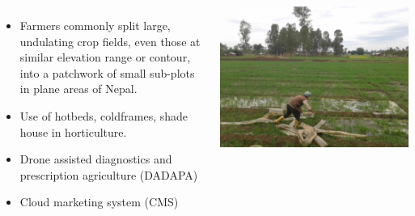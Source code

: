 \documentclass[11pt,dvipsnames,ignorenonframetext,aspectratio=169]{beamer}
\begin{document}
\begin{frame}{}
\protect\hypertarget{section-10}{}
\begin{columns}[T, onlytextwidth]

\begin{itemize}
\item Farmers commonly split large, undulating crop fields, even those at similar elevation range or contour, into a
patchwork of small sub-plots in plane areas of Nepal.
\item Use of hotbeds, coldframes, shade house in horticulture.
\item Drone assisted diagnostics and prescription agriculture (DADAPA)
\item Cloud marketing system (CMS)
\end{itemize}



\includegraphics[width=0.9\linewidth]{../images/irrigating_farmer} 

\end{columns}
\end{frame}
\end{document}
